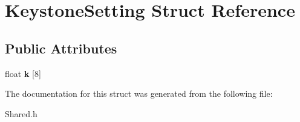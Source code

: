 \hypertarget{structKeystoneSetting}{
\section{KeystoneSetting Struct Reference}
\label{structKeystoneSetting}
}
\subsection*{Public Attributes}
\begin{DoxyCompactItemize}
\item 
\hypertarget{structKeystoneSetting_af5d1739dd1cf1a477cd4b92bf138f5de}{
float {\bfseries k} \mbox{[}8\mbox{]}}
\label{structKeystoneSetting_af5d1739dd1cf1a477cd4b92bf138f5de}

\end{DoxyCompactItemize}


The documentation for this struct was generated from the following file:\begin{DoxyCompactItemize}
\item 
Shared.h\end{DoxyCompactItemize}
